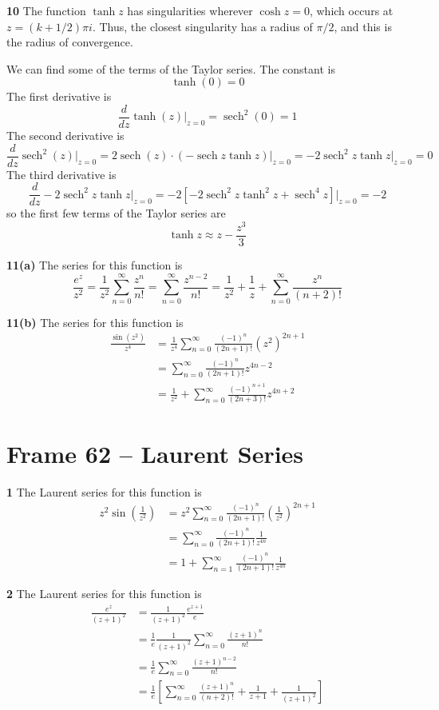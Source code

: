 \documentclass{article}
\DeclareMathOperator{\sech}{sech}
\begin{document}
\textbf{10}
The function $\tanh z$ has singularities wherever $\cosh z = 0$, which occurs at $z = (k + 1/2) \pi i$. Thus, the closest singularity has a radius of $\pi/2$, and this is the radius of convergence.

We can find some of the terms of the Taylor series. The constant is
\[
	\tanh(0) = 0
\]
The first derivative is
\[
	\frac{d}{dz} \tanh(z) \Big|_{z=0}
	= \sech^2(0)
	= 1
\]
The second derivative is
\[
	\frac{d}{dz} \sech^2(z) \Big|_{z=0}
	= 2\sech(z) \cdot (-\sech z \tanh z) \Big|_{z=0}
	= -2\sech^2 z \tanh z \Big|_{z=0}
	= 0
\]
The third derivative is
\[
	\frac{d}{dz} -2\sech^2 z \tanh z \Big|_{z=0}
	= -2 \left[ -2\sech^2 z \tanh^2 z + \sech^4 z \right] \Big|_{z=0}
	= -2
\]
so the first few terms of the Taylor series are
\[
	\tanh z \approx z - \frac{z^3}{3}
\]

\textbf{11(a)}
The series for this function is
\[
	\frac{e^z}{z^2}
	= \frac{1}{z^2} \sum_{n=0}^\infty \frac{z^n}{n!}
	= \sum_{n=0}^\infty \frac{z^{n-2}}{n!}
	= \frac{1}{z^2} + \frac{1}{z} + \sum_{n=0}^\infty \frac{z^n}{(n+2)!}
\]

\textbf{11(b)}
The series for this function is
\begin{align*}
	\frac{\sin(z^2)}{z^4}
	&= \frac{1}{z^4} \sum_{n=0}^\infty \frac{(-1)^n}{(2n+1)!} (z^2)^{2n+1} \\
	&= \sum_{n=0}^\infty \frac{(-1)^n}{(2n+1)!} z^{4n - 2} \\
	&= \frac{1}{z^2} + \sum_{n=0}^\infty \frac{(-1)^{n+1}}{(2n+3)!} z^{4n+2}
\end{align*}


\clearpage
\section{Frame 62 -- Laurent Series}
\textbf{1}
The Laurent series for this function is
\begin{align*}
	z^2 \sin\left( \frac{1}{z^2} \right)
	&= z^2 \sum_{n=0}^\infty \frac{(-1)^n}{(2n+1)!} \left( \frac{1}{z^2} \right)^{2n+1} \\
	&= \sum_{n=0}^\infty \frac{(-1)^n}{(2n+1)!} \frac{1}{z^{4n}} \\
	&= 1 + \sum_{n=1}^\infty \frac{(-1)^n}{(2n+1)!} \frac{1}{z^{4n}}
\end{align*}

\textbf{2}
The Laurent series for this function is
\begin{align*}
	\frac{e^z}{(z+1)^2}
	&= \frac{1}{(z+1)^2} \frac{e^{z+1}}{e} \\
	&= \frac{1}{e} \frac{1}{(z+1)^2} \sum_{n=0}^\infty \frac{(z+1)^n}{n!} \\
	&= \frac{1}{e} \sum_{n=0}^\infty \frac{(z+1)^{n-2}}{n!} \\
	&= \frac{1}{e} \left[ \sum_{n=0}^\infty \frac{(z+1)^n}{(n+2)!} + \frac{1}{z+1} + \frac{1}{(z+1)^2} \right]
\end{align*}
\end{document}
